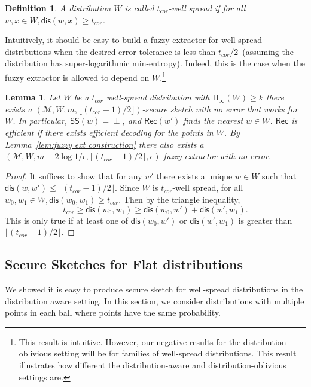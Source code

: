 \documentclass[11pt]{article}
\newcommand{\lemref}[1]{\mbox{Lemma~\ref{#1}}}
\newcommand{\class}[1]{{\ensuremath{\mathsf{#1}}}}
\newcommand{\sketch}{\ensuremath{\class{SS}}\xspace}
\newcommand{\rec}{\ensuremath{\class{Rec}}\xspace}
\newcommand{\dis}{\ensuremath{\mathsf{dis}}}
\newcommand{\Hoo}{\mathrm{H}_\infty}
\newtheorem{lemma}[theorem]{Lemma}
\newtheorem{definition}[theorem]{Definition}
\begin{document}
\begin{definition}
A distribution $W$ is called \emph{$t_{cor}$-well spread} if for all $w, x\in W, \dis(w, x)\ge t_{cor}$.
\end{definition}
Intuitively, it should be easy to build a fuzzy extractor for well-spread distributions when the desired error-tolerance is less than $t_{cor}/2$~(assuming the distribution has super-logarithmic min-entropy).  Indeed, this is the case when the fuzzy extractor is allowed to depend on $W$.\footnote{This result is intuitive.  However, our negative results for the distribution-oblivious setting will be for families of well-spread distributions.  This result illustrates how different the distribution-aware and distribution-oblivious settings are.}
\begin{lemma}
\label{lem:nosketchwellspread}
Let $W$ be a $t_{cor}$ well-spread distribution with $\Hoo(W)\ge k$ there exists a $(\mathcal{M}, W, m, \lfloor( t_{cor}-1)/2\rfloor)$-secure sketch with no error that works for $W$.  In particular, $\sketch(w) = \perp$, and $\rec(w')$ finds the nearest $w\in W$.  \rec is efficient if there exists efficient decoding for the points in $W$.  By \lemref{lem:fuzzy ext construction} there also exists a $(\mathcal{M}, W,m -2\log 1/\epsilon, \lfloor (t_{cor}-1)/2\rfloor, \epsilon)$-fuzzy extractor with no error.
\end{lemma}  
\begin{proof}
It suffices to show that for any $w'$ there exists a unique $w\in W$ such that $\dis (w, w')\le \lfloor (t_{cor}-1)/2\rfloor$.  Since $W$ is $t_{cor}$-well spread, for all $w_0, w_1 \in W, \dis (w_0, w_1)\ge t_{cor}$.  Then by the triangle inequality,
\[
t_{cor}\ge \dis(w_0, w_1) \ge \dis(w_0, w') + \dis(w', w_1).\]
This is only true if at least one of $\dis(w_0, w')$ or $\dis(w', w_1)$ is greater than $\lfloor (t_{cor}-1)/2\rfloor$.
\end{proof}

\subsection{Secure Sketches for Flat distributions}
We showed it is easy to produce secure sketch for well-spread distributions in the distribution aware setting.
In this section, we consider distributions with multiple points in each ball where points have the same probability.
\end{document}
